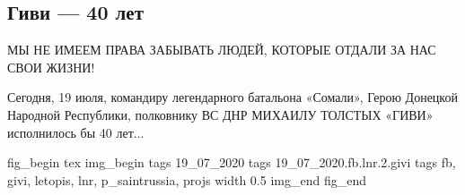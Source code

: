  
 
\subsection{Гиви --- 40 лет}
\label{sec:19_07_2020.fb.lnr.2.givi}
  
МЫ НЕ ИМЕЕМ ПРАВА ЗАБЫВАТЬ ЛЮДЕЙ, КОТОРЫЕ ОТДАЛИ ЗА НАС СВОИ ЖИЗНИ!

Сегодня, 19 июля, командиру легендарного батальона «Сомали», Герою Донецкой
Народной Республики, полковнику ВС ДНР МИХАИЛУ ТОЛСТЫХ «ГИВИ» исполнилось бы 40
лет...

\ifcmt
fig_begin 
	tex \centering
	img_begin 
		tags 19_07_2020
		tags 19_07_2020.fb.lnr.2.givi
		tags fb, givi, letopis, lnr, p_saintrussia, projs
		width 0.5
	img_end
fig_end
\fi
